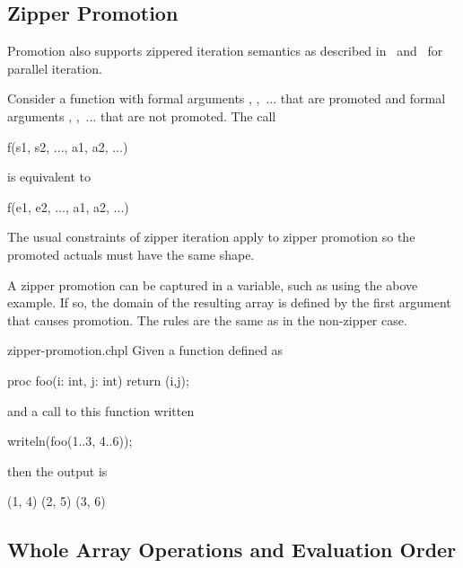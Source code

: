 \subsection{Zipper Promotion}
\label{Zipper_Promotion}

Promotion also supports zippered iteration semantics as described
in~ and~ for parallel
iteration.

Consider a function  with formal
arguments , ,~... that are promoted and formal
arguments , ,~... that are not promoted.  The call
\begin{chapel}
f(s1, s2, ..., a1, a2, ...)
\end{chapel}
is equivalent to
\begin{chapel}
[(e1, e2, ...) in zip(s1, s2, ...)] f(e1, e2, ..., a1, a2, ...)
\end{chapel}
The usual constraints of zipper iteration apply to zipper promotion so
the promoted actuals must have the same shape.

A zipper promotion can be captured in a variable, such as
 using the above example.
If so, the domain of the resulting array is defined by the first argument
that causes promotion. The rules are the same as in the non-zipper case.


\begin{chapelexample}{zipper-promotion.chpl}
Given a function defined as
\begin{chapel}
proc foo(i: int, j: int) {
  return (i,j);
}
\end{chapel}
and a call to this function written
\begin{chapel}
writeln(foo(1..3, 4..6));
\end{chapel}
then the output is
\begin{chapelprintoutput}{}
(1, 4) (2, 5) (3, 6)
\end{chapelprintoutput}
\end{chapelexample}


\subsection{Whole Array Operations and Evaluation Order}
\label{Whole_Array_Operations}

